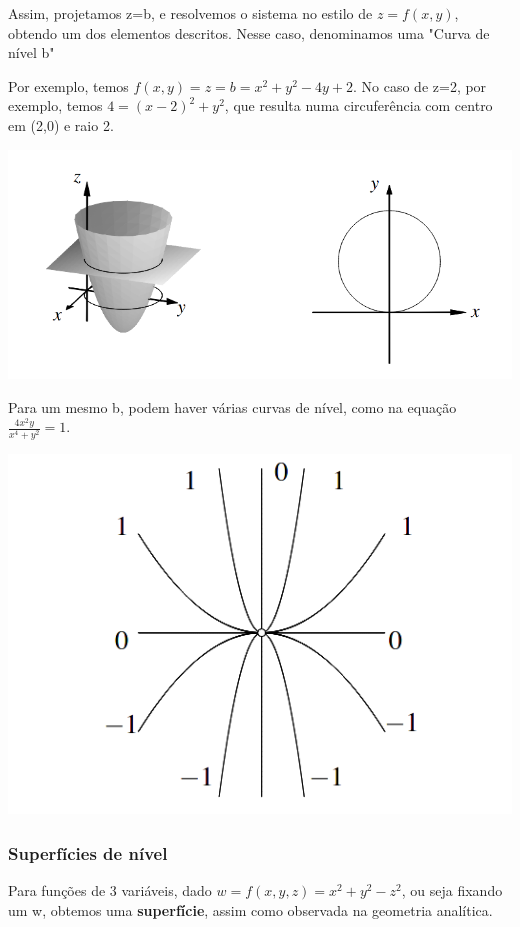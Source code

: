 \documentclass[letterpaper, 11pt]{article}
\begin{document}
Assim, projetamos z=b,  e resolvemos o sistema no estilo de \(z = f(x,y)\), obtendo um dos elementos descritos. Nesse caso, denominamos uma "Curva de nível b"

Por exemplo, temos \(f(x,y) = z = b = x^2 +y^2 -4y+2\). No caso de z=2, por exemplo, temos \(4 = (x-2)^2 + y^2\), que resulta numa circuferência com centro em (2,0) e raio 2.

\begin{center}
\includegraphics[width=.9\linewidth]{./img/curvanivel.png}
\end{center}

Para um mesmo b, podem haver várias curvas de nível, como na equação \(\frac{4x^2y}{x^4+y^2} = 1\).

\begin{center}
\includegraphics[width=.9\linewidth]{./img/nivelmultipla.png}
\end{center}

\subsubsection{Superfícies de nível}
\label{sec:org10b8a3d}
Para funções de 3 variáveis, dado \(w = f(x,y,z) = x^2+y^2-z^2\), ou seja fixando um w, obtemos uma \textbf{superfície}, assim como observada na geometria analítica.
\end{document}
